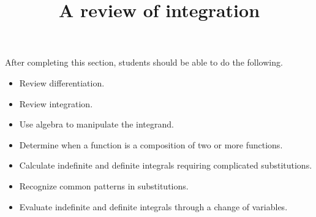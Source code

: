\documentclass{ximera}
\title{A review of integration}
\begin{document}
\begin{abstract}
\end{abstract}

\maketitle

\begin{sectionOutcomes}

After completing this section, students should be able to do the following.

\begin{itemize}
	\item Review differentiation.
	\item Review integration.
	\item Use algebra to manipulate the integrand.
        \item Determine when a function is a composition of two or more functions.
	\item Calculate indefinite and definite integrals requiring complicated substitutions.
	\item Recognize common patterns in substitutions.
	\item Evaluate indefinite and definite integrals through a change of variables.
\end{itemize}

\end{sectionOutcomes}
\end{document}

